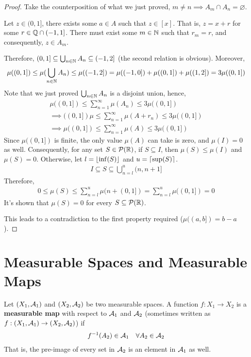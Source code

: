 \documentclass[11pt]{article}
\numberwithin{equation}{section}
\begin{document}
\begin{proof}
		Take the counterposition of what we just proved, $m \neq n \implies A_m \cap A_n = \varnothing$.
		
		Let $z \in (0, 1]$, there exists some $a \in A$ such that $z \in [x]$. That is, $z = x + r$ for some $r \in \mathbb{Q} \cap (-1, 1]$. There must exist some $m \in \mathbb{N}$ such that $r_m = r$, and consequently, $z \in A_m$.
		 
		Therefore, $(0, 1] \subseteq \bigcup_{n\in \mathbb{N}} A_n \subseteq (-1, 2]$ (the second relation is obvious). Moreover,
		\begin{align}
			\mu((0, 1]) \leq \mu(\bigcup_{n\in \mathbb{N}} A_n) \leq \mu((-1, 2]) = \mu((-1, 0]) + \mu((0, 1]) + \mu((1, 2]) = 3 \mu((0, 1])
		\end{align}
		Note that we just proved $\bigcup_{n\in \mathbb{N}} A_n$ is a disjoint union, hence,
		\begin{align}
			\mu((0, 1]) \leq \sum_{n=1}^\infty \mu(A_n) \leq 3\mu((0, 1]) \\
			\implies((0, 1]) \mu \leq \sum_{n=1}^\infty \mu(A + r_n) \leq 3\mu((0, 1]) \\
			\implies \mu((0, 1]) \leq \sum_{n=1}^\infty \mu(A) \leq 3\mu((0, 1])
		\end{align}
		Since $\mu((0, 1])$ is finite, the only value $\mu(A)$ can take is zero, and $\mu(I) = 0$ as well. Consequently, for any set $S \in \mathcal{{P}}(\mathbb{R})$, if $S \subseteq I$, then $\mu(S) \leq \mu(I)$ and $\mu(S) = 0$. Otherwise, let $l = \lfloor\inf(S)\rfloor$ and $u = \lceil\sup(S)\rceil$.
		\begin{align}
			I \subseteq S \subseteq \bigcup_{n=l}^{u} (n, n+1]
		\end{align}
		Therefore,
		\begin{align}
			0 \leq \mu(S) \leq \sum_{n=l}^{u} \mu(n + (0, 1]) = \sum_{n=l}^{u} \mu((0, 1]) = 0
		\end{align}
		It's shown that $\mu(S) = 0$ for every $S \subseteq \mathcal{{P}}(\mathbb{R})$.
		
		This leads to a contradiction to the first property required ($\mu((a, b]) = b-a$).
	\end{proof}
	
	\section{Measurable Spaces and Measurable Maps}
	\begin{definition}
		Let $(X_1, \mathcal{{A}}_1)$ and $(X_2, \mathcal{{A}}_2)$ be two measurable spaces. A function $f: X_1 \to X_2$ is a \textbf{measurable map} with respect to $\mathcal{{A}}_1$ and $\mathcal{{A}}_2$ (sometimes written as $f: (X_1, \mathcal{{A}}_1) \to (X_2, \mathcal{{A}}_2)$) if
		\begin{align}
			f^{-1}(A_2) \in \mathcal{{A}}_1\quad \forall A_2 \in \mathcal{{A}}_2
		\end{align}
		That is, the pre-image of every set in $\mathcal{{A}}_2$ is an element in $\mathcal{{A}}_1$ as well.
	\end{definition}
	
\end{document}
